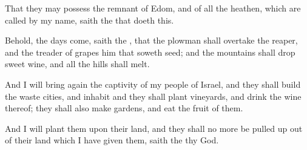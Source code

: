{That they may
possess the
remnant of
Edom, and of all the
heathen, which are
called by my
name,
saith the
{} that
doeth this.

Behold, the
days
come,
saith the
{}, that the
plowman shall
overtake the
reaper, and the
treader of
grapes him that
soweth
seed; and the
mountains shall
drop sweet
wine, and all the
hills shall
melt.

And I will bring
again the
captivity of my
people of
Israel, and they shall
build the
waste
cities, and
inhabit
{} and they shall
plant
vineyards, and
drink the
wine thereof; they shall also
make
gardens, and
eat the
fruit of them.

And I will
plant them upon their
land, and they shall no more be pulled
up out of their
land which I have
given them,
saith the
{} thy
God.


\par }